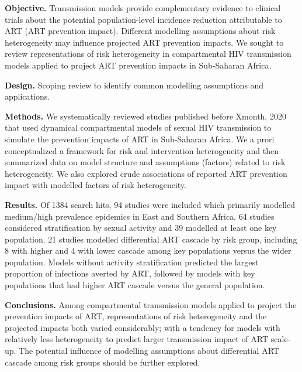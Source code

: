 \par\textbf{Objective.}
Transmission models provide complementary evidence to clinical trials about
the potential population-level incidence reduction attributable to ART
(ART prevention impact). %
Different modelling assumptions about risk heterogeneity may influence
projected ART prevention impacts.
We sought to review representations of risk heterogeneity in compartmental HIV transmission models
applied to project ART prevention impacts in Sub-Saharan Africa.
\par\textbf{Design.}
Scoping review to identify common modelling assumptions and applications.
\par\textbf{Methods.}
We systematically reviewed studies published before Xmonth, 2020 that used %
dynamical compartmental models of sexual HIV transmission
to simulate the prevention impacts of ART in Sub-Saharan Africa.
We a prori conceptualized a framework for risk and intervention heterogeneity and then 
summarized data on model structure and assumptions (factors) related to risk heterogeneity.
We also explored crude associations of reported ART prevention impact with modelled factors of risk heterogeneity.
\par\textbf{Results.}
Of 1384 search hits, 94 studies were included which primarily modelled medium/high prevalence epidemics in East and Southern Africa.
64 studies considered stratification by sexual activity and 39 modelled at least one key population. %
21 studies modelled differential ART cascade by risk group,
including 8 with higher and 4 with lower cascade among key populations versus the wider population.
Models without activity stratification predicted the largest proportion of infections averted by ART,
followed by models with key populations that had higher ART cascade versus the general population.
\par\textbf{Conclusions.}
Among compartmental transmission models applied to project the prevention impacts of ART,
representations of risk heterogeneity and the projected impacts both varied considerably; with a tendency for models 
with relatively less heterogeneity to predict larger transmission impact of ART scale-up.
The potential influence of modelling assumptions about
differential ART cascade among risk groups should be further explored.
